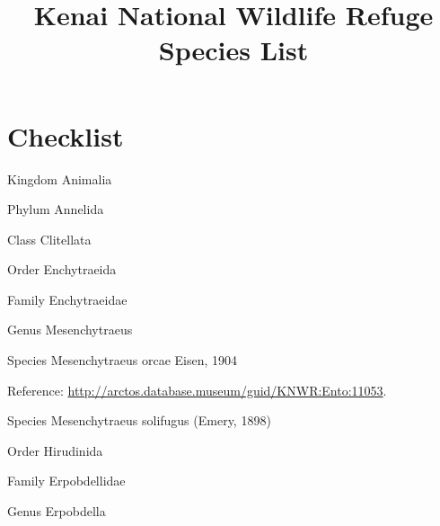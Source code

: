 \documentclass[9pt, article]{memoir}
\title{Kenai National Wildlife Refuge Species List}
\begin{document}
\maketitle

\chapter{Checklist}

\begin{multicols}{2}

\vspace{6pt}\noindent\hspace{0pt}Kingdom Animalia


\vspace{6pt}\noindent\hspace{6pt}Phylum Annelida


\vspace{6pt}\noindent\hspace{12pt}Class Clitellata


\vspace{6pt}\noindent\hspace{18pt}Order Enchytraeida


\vspace{6pt}\noindent\hspace{24pt}Family Enchytraeidae


\vspace{6pt}\noindent\hspace{30pt}Genus Mesenchytraeus


\vspace{6pt}\noindent\hspace{36pt}Species Mesenchytraeus orcae Eisen, 1904


\vspace{6pt}Reference: 
\url{http://arctos.database.museum/guid/KNWR:Ento:11053}.

\vspace{6pt}\noindent\hspace{36pt}Species Mesenchytraeus solifugus (Emery, 1898)


\vspace{6pt}\noindent\hspace{18pt}Order Hirudinida


\vspace{6pt}\noindent\hspace{24pt}Family Erpobdellidae


\vspace{6pt}\noindent\hspace{30pt}Genus Erpobdella



\end{multicols}
\end{document}
